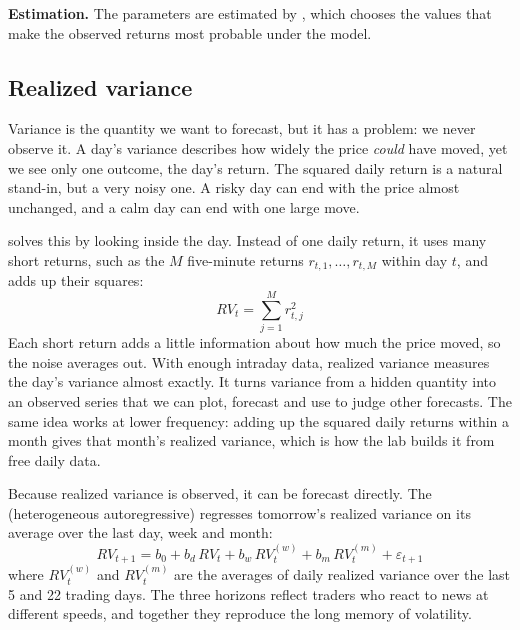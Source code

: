 \textbf{Estimation.} The parameters are estimated by , which chooses the values that make the observed returns most probable under the model.


\subsection{Realized variance}
\label{sec:10-rv}

Variance is the quantity we want to forecast, but it has a problem: we never observe it. A day's variance describes how widely the price \emph{could} have moved, yet we see only one outcome, the day's return. The squared daily return is a natural stand-in, but a very noisy one. A risky day can end with the price almost unchanged, and a calm day can end with one large move.

 solves this by looking inside the day. Instead of one daily return, it uses many short returns, such as the $M$ five-minute returns $r_{t,1}, \dots, r_{t,M}$ within day $t$, and adds up their squares:
\begin{equation}
  RV_t = \sum_{j=1}^{M} r^2_{t,j}
  \label{eq:10-rv}
\end{equation}
Each short return adds a little information about how much the price moved, so the noise averages out. With enough intraday data, realized variance measures the day's variance almost exactly. It turns variance from a hidden quantity into an observed series that we can plot, forecast and use to judge other forecasts. The same idea works at lower frequency: adding up the squared daily returns within a month gives that month's realized variance, which is how the lab builds it from free daily data.

Because realized variance is observed, it can be forecast directly. The  (heterogeneous autoregressive) regresses tomorrow's realized variance on its average over the last day, week and month:
\begin{equation}
  RV_{t+1} = b_0 + b_d\,RV_t + b_w\,RV^{(w)}_t + b_m\,RV^{(m)}_t + \varepsilon_{t+1}
  \label{eq:10-har}
\end{equation}
where $RV^{(w)}_t$ and $RV^{(m)}_t$ are the averages of daily realized variance over the last 5 and 22 trading days. The three horizons reflect traders who react to news at different speeds, and together they reproduce the long memory of volatility.


